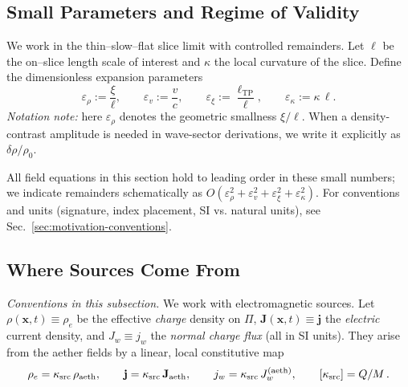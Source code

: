 \subsection{Small Parameters and Regime of Validity}
\label{sec:EM_validity}
We work in the thin–slow–flat slice limit with controlled remainders. Let $\ell$ be the on–slice length scale of interest and $\kappa$ the local curvature of the slice. Define the dimensionless expansion parameters
\[
\varepsilon_\rho := \frac{\xi}{\ell},\qquad
\varepsilon_v := \frac{v}{c},\qquad
\varepsilon_\xi := \frac{\ell_{\mathrm{TP}}}{\ell},\qquad
\varepsilon_\kappa := \kappa\,\ell.
\]
\emph{Notation note:} here $\varepsilon_\rho$ denotes the geometric smallness $\xi/\ell$. When a density-contrast amplitude is needed in wave-sector derivations, we write it explicitly as $\delta\rho/\rho_0$.

All field equations in this section hold to leading order in these small numbers; we indicate remainders schematically as $O(\varepsilon_\rho^2+\varepsilon_v^2+\varepsilon_\xi^2+\varepsilon_\kappa^2)$. For conventions and units (signature, index placement, SI vs. natural units), see Sec.~\ref{sec:motivation-conventions}.

\subsection{Where Sources Come From}

\textit{Conventions in this subsection.}
We work with electromagnetic sources. Let
$\rho(\mathbf x,t)\equiv\rho_e$ be the effective \emph{charge} density on $\Pi$,
$\mathbf J(\mathbf x,t)\equiv\mathbf j$ the \emph{electric} current density,
and $J_w \equiv j_w$ the \emph{normal charge flux} (all in SI units).
They arise from the aether fields by a linear, local constitutive map
\[
\rho_e=\kappa_{\rm src}\,\rho_{\rm aeth},\qquad
\mathbf j=\kappa_{\rm src}\,\mathbf J_{\rm aeth},\qquad
j_w=\kappa_{\rm src}\,J_w^{\rm (aeth)},\qquad
[\kappa_{\rm src}] = Q/M \, .
\]

